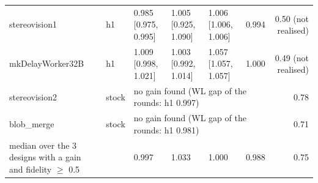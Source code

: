 \begin{table}[t]
\begin{tabular}{@{}llllllr@{}}
stereovision1 & h1 & 0.985 [0.975, 0.995] & 1.005 [0.925, 1.090] & 1.006 [1.006, 1.006] & 0.994 & 0.50 (not realised) \\
mkDelayWorker32B & h1 & 1.009 [0.998, 1.021] & 1.003 [0.992, 1.014] & 1.057 [1.057, 1.057] & 1.000 & 0.49 (not realised) \\
stereovision2 & stock & \multicolumn{4}{l}{no gain found (WL gap of the rounds: h1 0.997)} & 0.78 \\
blob\_merge & stock & \multicolumn{4}{l}{no gain found (WL gap of the rounds: h1 0.981)} & 0.71 \\
\midrule
median over the 3 designs with a gain and fidelity $\ge$ 0.5 & & 0.997 & 1.033 & 1.000 & 0.988 & 0.75 \\
\bottomrule
\end{tabular}
\end{table}

